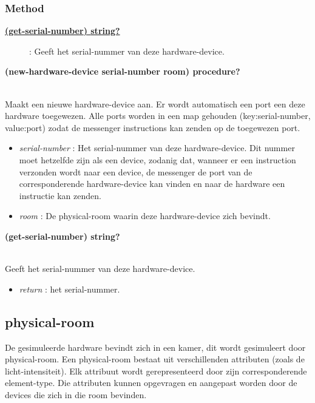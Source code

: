 \documentclass{article}
\newcommand{\ar}{\ding{213} }
\newcommand{\code}[1]{\textcolor{code}{#1}}
\newcommand{\lb}[1][]{\code{(#1}}
\newcommand{\rb}{\code{)}}
\newcommand{\racket}[1]{
	{\color{blue}\textbf{#1}}
}
\begin{document}
\subsubsection{Method}
\begin{description}
	\item[\hyperlink{hardware-device:get-serial-number}{\racket{\lb[get-serial-number]\rb \ar \code{string?}}}] : Geeft het serial-nummer van deze hardware-device.
\end{description}

\begin{framed}
	\hypertarget{hardware-device:new-hardware-device}{\racket{\lb[new-hardware-device] serial-number room\rb \ar \code{procedure?}}}
	\\Maakt een nieuwe hardware-device aan. Er wordt automatisch een port een deze hardware toegewezen. Alle ports worden in een map gehouden (key:serial-number, value:port) zodat de messenger instructions kan zenden op de toegewezen port.
	\begin{itemize}
		\item \emph{serial-number} : Het serial-nummer van deze hardware-device. Dit nummer moet hetzelfde zijn als een device, zodanig dat, wanneer er een instruction verzonden wordt naar een device, de messenger de port van de corresponderende hardware-device kan vinden en naar de hardware een instructie kan zenden.
		\item \emph{room} : De physical-room waarin deze hardware-device zich bevindt.
	\end{itemize}
\end{framed}

\begin{framed}
	\hypertarget{hardware-device:get-serial-number}{\racket{\lb[get-serial-number]\rb \ar \code{string?}}}
	\\Geeft het serial-nummer van deze hardware-device.
	\begin{itemize}
		\item \emph{return} : het serial-nummer.
	\end{itemize}
\end{framed}

\newpage
\hypertarget{physical-room}{\subsection{physical-room}}
 De gesimuleerde hardware bevindt zich in een kamer, dit wordt gesimuleert door physical-room. Een physical-room bestaat uit verschillenden attributen (zoals de licht-intensiteit). Elk attribuut wordt gerepresenteerd door zijn corresponderende element-type. Die attributen kunnen opgevragen en aangepast worden door de devices die zich in die room bevinden.
\end{document}
